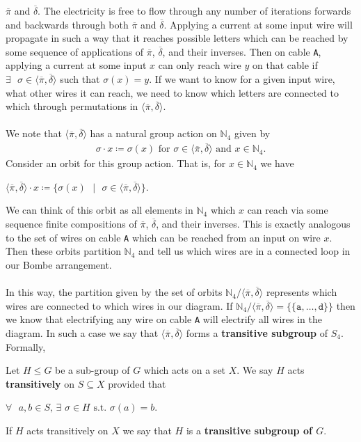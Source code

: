 $\overline\pi$ and $\overline\delta$. The electricity is free to flow
through any number of iterations forwards and backwards through both
$\overline\pi$ and $\overline\delta$. Applying a current at some
input wire will propagate in such a way that it reaches possible
letters which can be reached by some sequence of applications of
$\overline\pi$, $\overline\delta$, and their inverses. Then on cable
\texttt{A}, applying a current at some input $x$ can only reach wire
$y$ on that cable if $\exists\text{ }\sigma\in\langle\overline\pi,
\overline\delta\rangle$ such that $\sigma(x) = y$. If we want to know
for a given input wire, what other wires it can reach, we need to
know which letters are connected to which through permutations in
$\langle\overline\pi, \overline\delta\rangle$.
\\\\We note that $\langle\overline\pi, \overline\delta\rangle$ has a
natural group action on $\mathbb{N}_{4}$ given by
\begin{align*}
  \sigma\cdot{x} \coloneq \sigma(x)\text{ for
  }\sigma\in\langle\overline\pi, \overline\delta\rangle\text{ and
  }x\in\mathbb{N}_{4}.
\end{align*}
Consider an orbit for this group action. That is, for
$x\in\mathbb{N}_{4}$ we have
\begin{center}
  $\langle\overline\pi, \overline\delta\rangle\cdot
  x\coloneq\{\sigma(x)\text{ }|\text{ }\sigma\in\langle\overline\pi,
  \overline\delta\rangle\}$.
\end{center}
\noindent We can think of this orbit as all elements in
$\mathbb{N}_{4}$ which $x$ can reach via some sequence finite
compositions of $\overline\pi$, $\overline\delta$, and their
inverses. This is exactly analogous to the set of wires on cable
\texttt{A} which can be reached from an input on wire $x$. Then these
orbits partition $\mathbb{N}_{4}$ and tell us which wires are in a
connected loop in our Bombe arrangement.
\\\\In this way, the partition given by the set of orbits
$\mathbb{N}_{4}/\langle\overline\pi, \overline\delta\rangle$
represents which wires are connected to which wires in our diagram.
If $\mathbb{N}_{4}/\langle\overline\pi, \overline\delta\rangle =
\{\{\texttt{a},\dots,\texttt{d}\}\}$ then we know that electrifying
any wire on cable \texttt{A} will electrify all wires in the diagram.
In such a case we say that $\langle\overline\pi,
\overline\delta\rangle$ forms a {\bf{transitive subgroup}} of $S_4$. Formally,
\begin{definition}
  Let $H\le{G}$ be a sub-group of $G$ which acts on a set $X$. We say
  $H$ acts {\bf{transitively}} on $S\subseteq{X}$ provided that
  \begin{center}
    $\forall\text{ }a,b\in S\text{, }\exists\text{
    }\sigma\in{H}\text{ s.t. }\sigma(a)=b$.
  \end{center}
  If $H$ acts transitively on $X$ we say that $H$ is a
  {\bf{transitive subgroup of $G$}}.
\end{definition}
